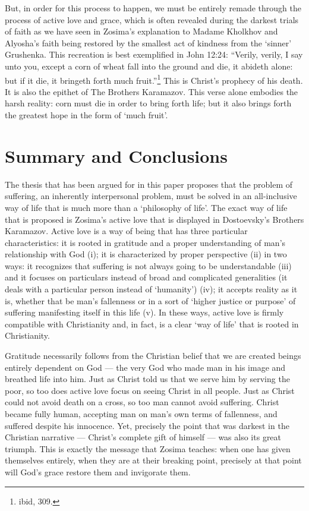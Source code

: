 But, in order for this process to happen, we must be entirely remade through the process of active love and grace, which is often revealed during the darkest trials of faith as we have seen in Zosima's explanation to Madame Kholkhov and Alyosha's faith being restored by the smallest act of kindness from the `sinner' Grushenka. This recreation is best exemplified  in John 12:24: ``Verily, verily, I say unto you, except a corn of wheat fall into the ground and die, it abideth alone: but if it die, it bringeth forth much fruit.''\footnote{ibid, 309.} This is Christ's prophecy of his death. It is also the epithet of The Brothers Karamazov. This verse alone embodies the harsh reality: corn must die in order to bring forth life; but it also brings forth the greatest hope in the form of `much fruit'.

\chapter{Summary and Conclusions}
The thesis that has been argued for in this paper proposes that the problem of suffering, an inherently interpersonal problem, must be solved in an all-inclusive way of life that is much more than a `philosophy of life'. The exact way of life that is proposed is Zosima's active love that is displayed in Dostoevsky's Brothers Karamazov. Active love is a way of being that has three particular characteristics: it is rooted in gratitude and a proper understanding of man's relationship with God (i); it is characterized by proper perspective (ii) in two ways: it recognizes that suffering is not always going to be understandable (iii) and it focuses on particulars instead of broad and complicated generalities (it deals with a particular person instead of `humanity') (iv); it accepts reality as it is, whether that be man's fallenness or in a sort of `higher justice or purpose' of suffering manifesting itself in this life (v). In these ways, active love is firmly compatible with Christianity and, in fact, is a clear `way of life' that is rooted in Christianity. 

Gratitude necessarily follows from the Christian belief that we are created beings entirely dependent on God --- the very God who made man in his image and breathed life into him. Just as Christ told us that we serve him by serving the poor, so too does active love focus on seeing Christ in all people. Just as Christ could not avoid death on a cross, so too man cannot avoid suffering. Christ became fully human, accepting man on man's own terms of fallenness, and suffered despite his innocence. Yet, precisely the point that was darkest in the Christian narrative --- Christ's complete gift of himself --- was also its great triumph. This is exactly the message that Zosima teaches: when one has given themselves entirely, when they are at their breaking point, precisely at that point will God's grace restore them and invigorate them.


